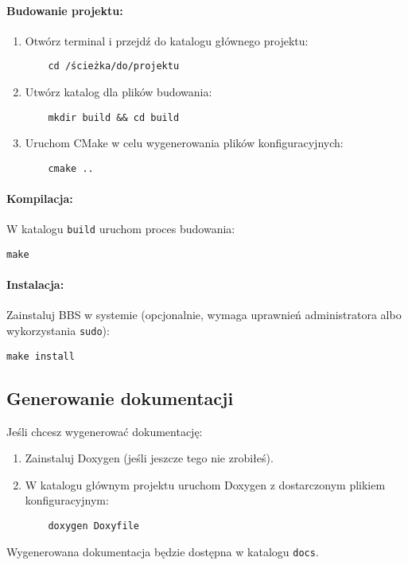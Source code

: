 \paragraph{Budowanie projektu:}
\begin{enumerate}
    \item Otwórz terminal i przejdź do katalogu głównego projektu:
    \begin{verbatim}
    cd /ścieżka/do/projektu
    \end{verbatim}
    \item Utwórz katalog dla plików budowania:
    \begin{verbatim}
    mkdir build && cd build
    \end{verbatim}
    \item Uruchom CMake w celu wygenerowania plików konfiguracyjnych:
    \begin{verbatim}
    cmake ..
    \end{verbatim}
\end{enumerate}

\paragraph{Kompilacja:} 
W katalogu \texttt{build} uruchom proces budowania:
\begin{verbatim}
make
\end{verbatim}

\paragraph{Instalacja:} 
Zainstaluj BBS w systemie (opcjonalnie, wymaga uprawnień administratora albo wykorzystania \texttt{sudo}):
\begin{verbatim}
make install
\end{verbatim}

\subsection{Generowanie dokumentacji}
Jeśli chcesz wygenerować dokumentację:
\begin{enumerate}
    \item Zainstaluj Doxygen (jeśli jeszcze tego nie zrobiłeś).
    \item W katalogu głównym projektu uruchom Doxygen z dostarczonym plikiem konfiguracyjnym:
    \begin{verbatim}
    doxygen Doxyfile
    \end{verbatim}
\end{enumerate}
Wygenerowana dokumentacja będzie dostępna w katalogu \texttt{docs}.

